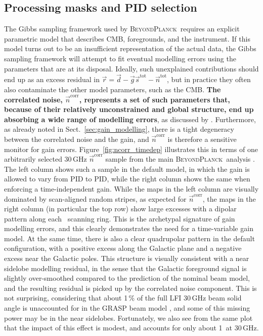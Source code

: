 \documentclass[twocolumn]{aa}
\renewcommand{\d}[0]{\vec{d}}
\newcommand{\n}[0]{\vec{n}}
\newcommand{\s}[0]{\vec{s}}
\newcommand{\g}[0]{\vec{g}}
\renewcommand{\r}[0]{\vec{r}}
\newcommand{\BP}{\textsc{BeyondPlanck}}
\newcommand{\tot}[0]{^{\mathrm{tot}}}
\newcommand{\corr}[0]{^{\mathrm{corr}}}
\begin{document}
\subsection{Processing masks and PID selection}
\label{sec:procmasks}
The Gibbs sampling framework used by \BP\ requires an explicit
parametric model that describes CMB, foregrounds, and the
instrument. If this model turns out to be an insufficient
representation of the actual data, the Gibbs sampling framework will
attempt to fit eventual modelling errors using the parameters that are
at its disposal. Ideally, such unexplained contributions should end up
as an excess residual in $\r = \d - \g\s\tot - \n\tot$, but in
practice they often also contaminate the other model parameters, such
as the CMB. \textbf{The correlated noise, $\n\corr$, represents a set of such parameters
that, because of their relatively unconstrained and global structure,
end up absorbing a wide range of modelling errors}, as discussed by
\citet{bp06}. Furthermore, as already noted in
Sect.~\ref{sec:gain_modelling}, there is a tight degeneracy between
the correlated noise and the gain, and $\n\corr$ is therefore a
sensitive monitor for gain errors. Figure~\ref{fig:ncorr_timedep}
illustrates this in terms of one arbitrarily selected 30\,GHz
$\n\corr$ sample from the main \BP\ analysis \citep{bp01}. The left
column shows such a sample in the default model, in which the gain is
allowed to vary from PID to PID, while the right column shows the same
when enforcing a time-independent gain. While the maps in the left
column are visually dominated by scan-aligned random stripes, as
expected for $\n\corr$, the maps in the right column (in particular
the top row) show large excesses with a dipolar pattern along each
\Planck\ scanning ring. This is the archetypal signature of gain
modelling errors, and this clearly demonstrates the need for a
time-variable gain model. At the same time, there is also a clear
quadrupolar pattern in the default configuration, with a positive
excess along the Galactic plane and a negative excess near the
Galactic poles. This structure is visually consistent with a near
sidelobe modelling residual, in the sense that the Galactic foreground
signal is slightly over-smoothed compared to the prediction of the
nominal beam model, and the resulting residual is picked up by the
correlated noise component. This is not surprising, considering that
about 1\,\% of the full LFI 30\,GHz beam solid angle is unaccounted
for in the GRASP beam model \citep{planck2016-l02}, and some of this
missing power may be in the near sidelobes. Fortunately, we also see
from the same plot that the impact of this effect is modest, and
accounts for only about 1\muK\ at 30\,GHz.
\end{document}
